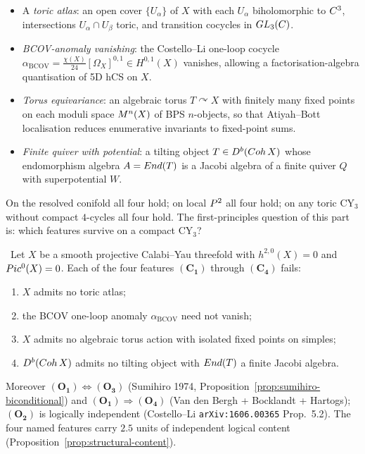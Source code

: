 \begin{itemize}[leftmargin=2em]
\item[$(\mathbf{C_1})$] A \emph{toric atlas}: an open cover $\{U_\alpha\}$
  of $X$ with each $U_\alpha$ biholomorphic to $C^3$, intersections
  $U_\alpha \cap U_\beta$ toric, and transition cocycles in
  $GL_3(C)$.
\item[$(\mathbf{C_2})$] \emph{BCOV-anomaly vanishing}: the Costello--Li
  one-loop cocycle $\alpha_{\mathrm{BCOV}} = \tfrac{\chi(X)}{24}
  [\Omega_X]^{0,1} \in H^{0,1}(X)$ vanishes, allowing a
  factorisation-algebra quantisation of 5D hCS on $X$.
\item[$(\mathbf{C_3})$] \emph{Torus equivariance}: an algebraic torus
  $T \curvearrowright X$ with finitely many fixed points on each
  moduli space $M^n(X)$ of BPS $n$-objects, so that
  Atiyah--Bott localisation reduces enumerative invariants to fixed-point
  sums.
\item[$(\mathbf{C_4})$] \emph{Finite quiver with potential}: a tilting
  object $T \in D^b(Coh\,X)$ whose endomorphism algebra $A = End(T)$
  is a Jacobi algebra of a finite quiver $Q$ with superpotential $W$.
\end{itemize}

On the resolved conifold all four hold; on local $P^2$ all four hold;
on any toric CY$_3$ without compact $4$-cycles all four hold. The
first-principles question of this part is: which features survive on a
compact CY$_3$?

\begin{theorem}
\label{thm:four-obstructions}
\ClaimStatusProposition\
Let $X$ be a smooth projective Calabi--Yau threefold with $h^{2,0}(X) = 0$
and $Pic^0(X) = 0$. Each of the four features $(\mathbf{C_1})$ through
$(\mathbf{C_4})$ fails:
\begin{enumerate}[label=\emph{$(\mathbf{O_\arabic*})$}, leftmargin=2.5em]
\item $X$ admits no toric atlas;
\item the BCOV one-loop anomaly $\alpha_{\mathrm{BCOV}}$ need not
  vanish;
\item $X$ admits no algebraic torus action with isolated fixed points on
  simples;
\item $D^b(Coh\,X)$ admits no tilting object with $End(T)$ a finite
  Jacobi algebra.
\end{enumerate}
Moreover $(\mathbf{O_1}) \Leftrightarrow (\mathbf{O_3})$ (Sumihiro
1974, Proposition~\ref{prop:sumihiro-biconditional}) and
$(\mathbf{O_1}) \Rightarrow (\mathbf{O_4})$ (Van den Bergh + Bocklandt
+ Hartogs); $(\mathbf{O_2})$ is logically independent (Costello--Li
\texttt{arXiv:1606.00365} Prop.~5.2). The four named features carry
$2.5$ units of independent logical content
(Proposition~\ref{prop:structural-content}).
\end{theorem}

